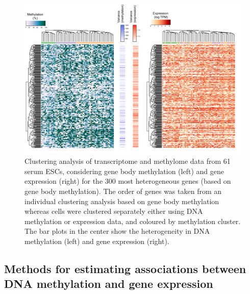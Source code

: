 \begin{figure}[htbp!]
\centering
\includegraphics[width=1.0\textwidth]{heat}
\caption[Clustering analysis of transcriptome and methylome data.]{Clustering analysis of transcriptome and methylome data from 61 serum ESCs, considering gene body methylation (left) and gene expression (right) for the 300 most heterogeneous genes (based on gene body methylation). The order of genes was taken from an individual clustering analysis based on gene body methylation whereas cells were clustered separately either using DNA methylation or expression data, and coloured by methylation cluster. The bar plots in the center show the heterogeneity in DNA methylation (left) and gene expression (right).}
\label{fig:mt_heat}
\end{figure}


\subsection{Methods for estimating associations between DNA methylation and gene expression} \label{sec:mt_method}

\newcommand{\Xcov}{\operatorname{cov}}
\newcommand{\Xcor}{\operatorname{cor}}

